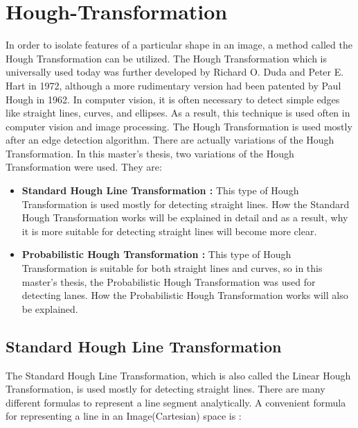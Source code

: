 \section{Hough-Transformation}\label{sec:Hough-Transformation}
%
In order to isolate features of a particular shape in an image, a method called the Hough Transformation can be utilized. The Hough Transformation which is universally used today was further developed by Richard O. Duda and Peter E. Hart in 1972, although a more rudimentary version had been patented by Paul Hough in 1962.\cite{Hough_Transformation} In computer vision, it is often necessary to detect simple edges like straight lines, curves, and ellipses. As a result, this technique is used often in computer vision and image processing. The Hough Transformation is used mostly after an edge detection algorithm. There are actually variations of the Hough Transformation. In this master's thesis, two variations of the Hough Transformation were used. They are:

\begin{itemize}

\item \textbf{Standard Hough Line Transformation : }This type of Hough Transformation is used mostly for detecting straight lines. How the Standard Hough Transformation works will be explained in detail and as a result, why it is more suitable for detecting straight lines will become more clear.

\item \textbf{Probabilistic Hough Transformation : }This type of Hough Transformation is suitable for both straight lines and curves, so in this master's thesis, the Probabilistic Hough Transformation was used for detecting lanes. How the Probabilistic Hough Transformation works will also be explained.

\end{itemize}
%
\subsection{Standard Hough Line Transformation}\label{sec:Standard Hough Line Transformation}
%
The Standard Hough Line Transformation, which is also called the Linear Hough Transformation, is used mostly for detecting straight lines. There are many different formulas to represent a line segment analytically. A convenient formula for representing a line in an Image(Cartesian) space is :

  \begin{center}


  \end{center}
  
